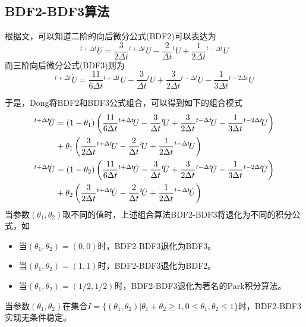 \subsection{BDF2-BDF3算法}
根据文，可以知道二阶的向后微分公式(BDF2)可以表达为
\begin{equation}
{^{t+\Delta t}\!\dot{U}}=\frac{3}{2\Delta t}{^{t+\Delta t}\!U}-\frac{2}{\Delta t}{^{t}\!U}+\frac{1}{2\Delta t}{^{t-\Delta t}\!U}
\end{equation}
而三阶向后微分公式(BDF3)则为
\begin{equation}
{^{t+\Delta t}\!\dot{U}}=\frac{11}{6\Delta t}{^{t+\Delta t}\!U}-\frac{3}{\Delta t}{^{t}\!U}+\frac{3}{2\Delta t}{^{t-\Delta t}\!U}-\frac{1}{3\Delta t}{^{t-2\Delta t}\!U}
\end{equation}

于是，Dong将BDF2和BDF3公式组合，可以得到如下的组合模式\cite{Dong2013a}
\begin{align}
{^{t+\Delta t}\!\dot{U}}&=(1-\theta_1)\left(\frac{11}{6\Delta t}{^{t+\Delta t}\!U}-\frac{3}{\Delta t}{^{t}\!U}+\frac{3}{2\Delta t}{^{t-\Delta t}\!U}-\frac{1}{3\Delta t}{^{t-2\Delta t}\!U} \right)\notag\\
&+\theta_1\left(\frac{3}{2\Delta t}{^{t+\Delta t}\!U}-\frac{2}{\Delta t}{^{t}\!U}+\frac{1}{2\Delta t}{^{t-\Delta t}\!U} \right)\\
{^{t+\Delta t}\!\ddot{U}}&=(1-\theta_2)\left(\frac{11}{6\Delta t}{^{t+\Delta t}\!\dot{U}}-\frac{3}{\Delta t}{^{t}\!\dot{U}}+\frac{3}{2\Delta t}{^{t-\Delta t}\!\dot{U}}-\frac{1}{3\Delta t}{^{t-2\Delta t}\!\dot{U}} \right)\notag\\
&+\theta_2\left(\frac{3}{2\Delta t}{^{t+\Delta t}\!\dot{U}}-\frac{2}{\Delta t}{^{t}\!\dot{U}}+\frac{1}{2\Delta t}{^{t-\Delta t}\!\dot{U}}\right)
\end{align}
当参数$(\theta_1,\theta_2)$取不同的值时，上述组合算法BDF2-BDF3将退化为不同的积分公式，如
\begin{itemize}
\item 当$(\theta_1,\theta_2)=(0,0)$时，BDF2-BDF3退化为BDF3。
\item 当$(\theta_1,\theta_2)=(1,1)$时，BDF2-BDF3退化为BDF2。
\item 当$(\theta_1,\theta_2)=(1/2,1/2)$时，BDF2-BDF3退化为著名的Park积分算法\cite{Park1975a}。
\end{itemize}
当参数$(\theta_1,\theta_2)$在集合$I=\{(\theta_1,\theta_2)|\theta_1+\theta_2\ge1,0\le\theta_1,\theta_2\le1\}$时，BDF2-BDF3实现无条件稳定\cite{Dong2013a}。

